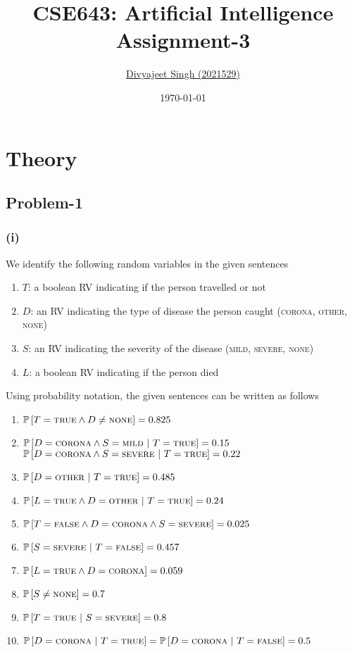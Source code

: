 \documentclass[12pt]{article}
\title{
    \textbf{CSE643: Artificial Intelligence} \\ \vspace*{-5pt}
    \textbf{\large{Assignment-3}}
}
\author{\href{mailto:divyajeet21529@iiitd.ac.in}{Divyajeet Singh (2021529)}}
\date{\today}
\newcommand{\prob}[1]{\mathbb{P}\left[#1\right]}
\newcommand{\true}{\textsc{true}}
\newcommand{\false}{\textsc{false}}
\begin{document}
    \maketitle

    \section*{Theory}

    \subsection*{Problem-1}
    \subsubsection*{(i)}
    We identify the following random variables in the given sentences
    \begin{enumerate}
        \item $T$: a boolean RV indicating if the person travelled or not
        \item $D$: an RV indicating the type of disease the person caught (\textsc{corona}, \textsc{other}, \textsc{none})
        \item $S$: an RV indicating the severity of the disease (\textsc{mild}, \textsc{severe}, \textsc{none})
        \item $L$: a boolean RV indicating if the person died
    \end{enumerate}
    Using probability notation, the given sentences can be written as follows
    \begin{enumerate}[label=(\alph*)]
        \item $\prob{T = \true \wedge D \neq \textsc{none}} = 0.825$
        \item $\prob{D = \textsc{corona} \wedge S = \textsc{mild} \ | \ T = \true} = 0.15$ \\
              $\prob{D = \textsc{corona} \wedge S = \textsc{severe} \ | \ T = \true} = 0.22$
        \item $\prob{D = \textsc{other} \ | \ T = \true} = 0.485$
        \item $\prob{L = \true \wedge D = \textsc{other} \ | \ T = \true} = 0.24$
        \item $\prob{T = \false \wedge D = \textsc{corona} \wedge S = \textsc{severe}} = 0.025$
        \item $\prob{S = \textsc{severe} \ | \ T = \false} = 0.457$
        \item $\prob{L = \true \wedge D = \textsc{corona}} = 0.059$
        \item $\prob{S \neq \textsc{none}} = 0.7$
        \item $\prob{T = \true \ | \ S = \textsc{severe}} = 0.8$
        \item $\prob{D = \textsc{corona} \ | \ T = \true} = \prob{D = \textsc{corona} \ | \ T = \false} = 0.5$
    \end{enumerate}
\end{document}
